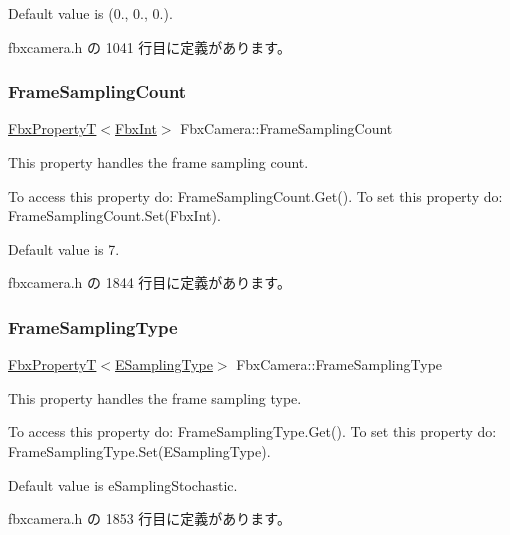 Default value is (0., 0., 0.). 

 fbxcamera.\+h の 1041 行目に定義があります。

\mbox{\label{class_fbx_camera_a71ee6802b2a63149cfa33f11548893ea}} 
\subsubsection{\texorpdfstring{Frame\+Sampling\+Count}{FrameSamplingCount}}
{\footnotesize\ttfamily \hyperlink{class_fbx_property_t}{Fbx\+PropertyT}$<$\hyperlink{fbxtypes_8h_a088fa96de3b0b3ea69f0f6afef525dfb}{Fbx\+Int}$>$ Fbx\+Camera\+::\+Frame\+Sampling\+Count}

This property handles the frame sampling count.

To access this property do\+: Frame\+Sampling\+Count.\+Get(). To set this property do\+: Frame\+Sampling\+Count.\+Set(\+Fbx\+Int).

Default value is 7. 

 fbxcamera.\+h の 1844 行目に定義があります。

\mbox{\label{class_fbx_camera_ab2048abc7b353f908a7c3caba7d0acf2}} 
\subsubsection{\texorpdfstring{Frame\+Sampling\+Type}{FrameSamplingType}}
{\footnotesize\ttfamily \hyperlink{class_fbx_property_t}{Fbx\+PropertyT}$<$\hyperlink{class_fbx_camera_aed549486ed0985230efca6fae0d731ae}{E\+Sampling\+Type}$>$ Fbx\+Camera\+::\+Frame\+Sampling\+Type}

This property handles the frame sampling type.

To access this property do\+: Frame\+Sampling\+Type.\+Get(). To set this property do\+: Frame\+Sampling\+Type.\+Set(\+E\+Sampling\+Type).

Default value is e\+Sampling\+Stochastic. 

 fbxcamera.\+h の 1853 行目に定義があります。

\mbox{\label{class_fbx_camera_ab04e1fdc21ced2af3a372cb3c3c45295}} 
